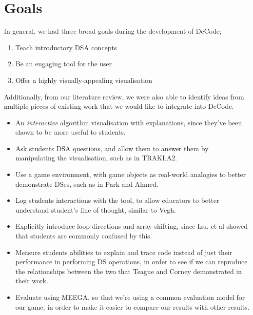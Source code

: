\documentclass[10pt]{article}
\begin{document}
\section{Goals}
In general, we had three broad goals during the development of DeCode;
\begin{enumerate}
  \item Teach introductory DSA concepts
  \item Be an engaging tool for the user
  \item Offer a highly visually-appealing visualisation
\end{enumerate}
Additionally, from our literature review, we were also able to identify ideas from multiple pieces of existing work that we would like to integrate into DeCode.
\begin{itemize}
  \item An \emph{interactive} algorithm visualisation with explanations, since they've been shown to be more useful to students\cite{vegh2}.
  \item Ask students DSA questions, and allow them to answer them by manipulating the visualisation, such as in TRAKLA2\cite{TRAKLA2}.
  \item Use a game environment, with game objects as real-world analogies to better demonstrate DSes, such as in Park and Ahmed\cite{Park}.
  \item Log students interactions with the tool, to allow educators to better understand student's line of thought, similar to Vegh\cite{vegh}.
  \item Explicitly introduce loop directions and array shifting, since Izu, et al\cite{izuloop} showed that students are commonly confused by this.
  \item Measure students abilities to explain and trace code instead of just their performance in performing DS operations, in order to see if we can reproduce the relationships between the two that Teague and Corney demonstrated in their work\cite{Teague:2012:SHW:2483716.2483727}. 
  \item Evaluate using MEEGA\cite{meegaPlus}, so that we're using a common evaluation model for our game, in order to make it easier to compare our results with other results.
\end{itemize}
\end{document}
